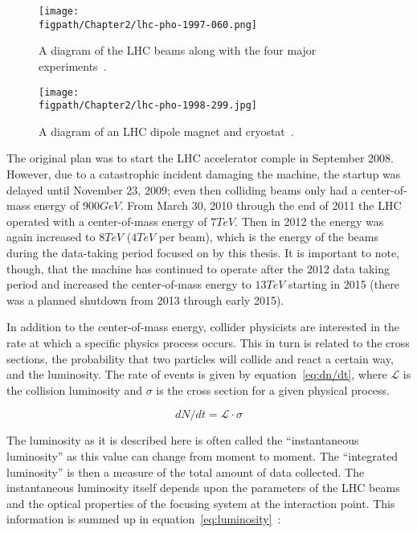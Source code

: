 \begin{figure}[!hbt]
	\centering
	\texttt{[image: \\figpath/Chapter2/lhc-pho-1997-060.png]}
	\caption{A diagram of the LHC beams along with the four major experiments~\cite{Jean-Luc:841573}.}
	\label{fig:LHC_beams}
\end{figure}

\begin{figure}[!hbt]
	\centering
	\texttt{[image: \\figpath/Chapter2/lhc-pho-1998-299.jpg]}
	\caption{A diagram of an LHC dipole magnet and cryostat~\cite{Dailler:842253}.}
	\label{fig:LHC_magnet}
\end{figure}

The original plan was to start the LHC accelerator comple in September 2008. However, due to a catastrophic incident damaging the machine, the startup was delayed until November 23, 2009; even then colliding beams only had a center-of-mass energy of $900\unit{GeV}$. From March 30, 2010 through the end of 2011 the LHC operated with a center-of-mass energy of $7\unit{TeV}$. Then in 2012 the energy was again increased to $8\unit{TeV}$ ($4\unit{TeV}$ per beam), which is the energy of the beams during the data-taking period focused on by this thesis. It is important to note, though, that the machine has continued to operate after the 2012 data taking period and increased the center-of-mass energy to $13\unit{TeV}$ starting in 2015 (there was a planned shutdown from 2013 through early 2015).

In addition to the center-of-mass energy, collider physicists are interested in the rate at which a specific physics process occurs. This in turn is related to the cross sections, the probability that two particles will collide and react a certain way, and the luminosity. The rate of events is given by equation~\ref{eq:dn/dt}, where $\mathcal{L}$ is the collision luminosity and $\sigma$ is the cross section for a given physical process.

\begin{equation}
dN/dt=\mathcal{L}{\cdot}\sigma
\label{eq:dn/dt}
\end{equation}

The luminosity as it is described here is often called the ``instantaneous luminosity'' as this value can change from moment to moment. The ``integrated luminosity'' is then a measure of the total amount of data collected. The instantaneous luminosity itself depends upon the parameters of the LHC beams and the optical properties of the focusing system at the interaction point. This information is summed up in equation~\ref{eq:luminosity}~\cite{1742-6596-455-1-012001}:

